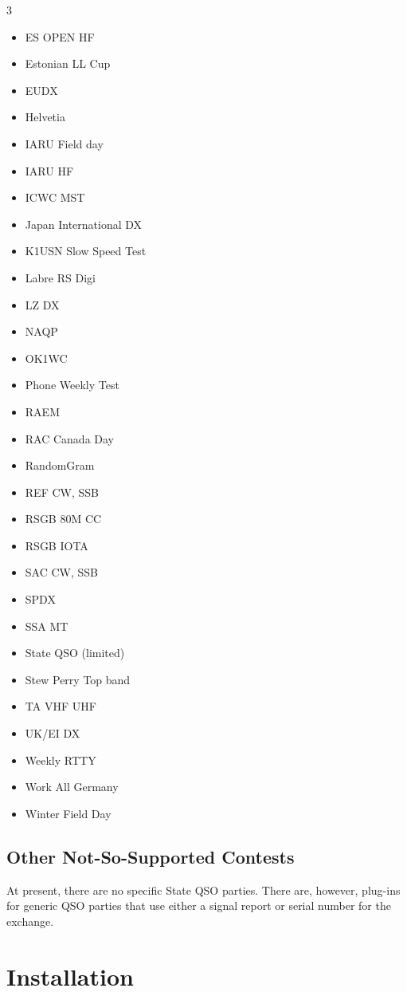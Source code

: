 \documentclass{article}
\begin{document}
\begin{multicols}{3}
\begin{itemize}
    \item ES OPEN HF
    \item Estonian LL Cup
    \item EUDX
    \item Helvetia
    \item IARU Field day
    \item IARU HF
    \item ICWC MST
    \item Japan International DX
    \item K1USN Slow Speed Test
    \item Labre RS Digi
    \item LZ DX
    \item NAQP
    \item OK1WC
    \item Phone Weekly Test
    \item RAEM
    \item RAC Canada Day
    \item RandomGram
    \item REF CW, SSB
    \item RSGB 80M CC
    \item RSGB IOTA
    \item SAC CW, SSB
    \item SPDX
    \item SSA MT
    \item State QSO (limited)
    \item Stew Perry Top band
    \item TA VHF UHF
    \item UK/EI DX
    \item Weekly RTTY
    \item Work All Germany
    \item Winter Field Day
\end{itemize}
\end{multicols}
\subsection{Other Not-So-Supported Contests}
At present, there are no specific State QSO parties. There are, however, plug-ins for generic QSO parties that use either a signal report or serial number for the exchange.
\newpage
\section{Installation}
\end{document}
